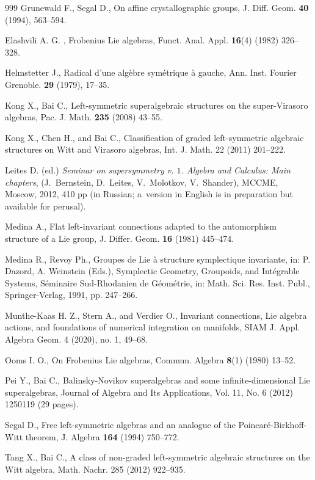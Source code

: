 \documentclass[12pt]{amsart}
\begin{document}
\begin{thebibliography}{999}
 Grunewald F., Segal D., On affine crystallographic groups, J. Diff. Geom. {\bf 40} (1994), 563--594. 

 Elashvili A. G. , Frobenius Lie algebras, Funct. Anal. Appl. {\bf 16}(4) (1982) 326--328.

 Helmstetter J., Radical d'une alg\`ebre sym\'etrique \`a gauche, Ann. Inst. Fourier Grenoble. {\bf 29} (1979), 17--35.


 Kong X.,  Bai C., Left-symmetric superalgebraic structures on the super-Virasoro algebras, Pac. J. Math. {\bf 235} (2008) 43--55.


 Kong X., Chen H., and Bai C., Classification of graded left-symmetric algebraic structures on Witt and Virasoro algebras, Int. J. Math. 22 (2011) 201--222.

Leites D. (ed.) \textit{Seminar on supersymmetry v. $1$. Algebra and
Calculus: Main chapters}, (J.~Bernstein, D.~Leites, V.~Molotkov,
V.~Shander), MCCME, Moscow, 2012, 410 pp (in Russian; a~version in
English is in preparation but available for perusal).

 Medina A., Flat left-invariant connections adapted to the automorphism structure of a Lie group, J. Differ. Geom. {\bf 16} (1981) 445--474.

 Medina R., Revoy Ph.,  Groupes de Lie \`a structure symplectique invariante, in: P. Dazord, A. Weinstein (Eds.),
Symplectic Geometry, Groupoids, and Int\'egrable Systems, S\'eminaire Sud-Rhodanien de G\'eom\'etrie, in: Math. Sci. Res. Inst. Publ., Springer-Verlag, 1991, pp. 247--266.

 Munthe-Kaas H. Z., Stern A.,  and Verdier O., Invariant connections, Lie algebra actions, and foundations of numerical integration on manifolds, SIAM J. Appl. Algebra Geom. 4 (2020), no. 1, 49--68.

 Ooms I. O., On Frobenius Lie algebras, Commun. Algebra {\bf 8}(1) (1980) 13--52.

 Pei Y., Bai C., Balinsky-Novikov superalgebras and some infinite-dimensional Lie superalgebras, Journal of Algebra and Its Applications,  Vol. 11, No. 6 (2012) 1250119 (29 pages).

 Segal D., Free left-symmetric algebras and an analogue of the Poincar\'e-Birkhoff-Witt theorem, J. Algebra {\bf 164} (1994) 750--772.

 Tang X.,  Bai C., A class of non-graded left-symmetric algebraic structures on the Witt algebra, Math. Nachr. 285 (2012) 922--935.


\end{thebibliography}
\end{document}
